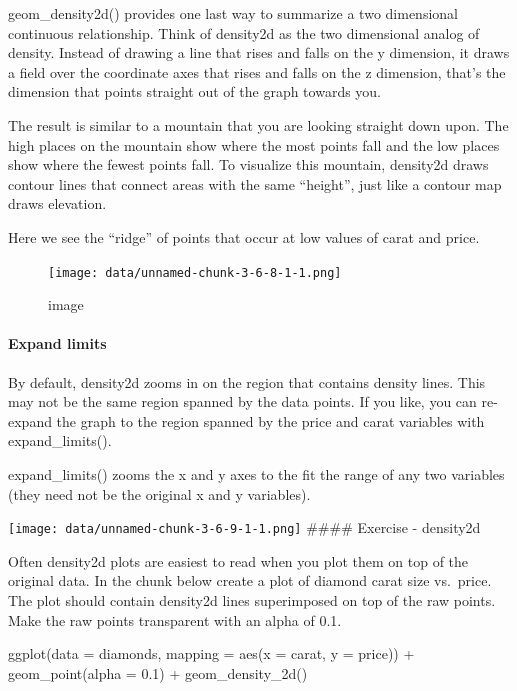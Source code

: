 \documentclass[
]{article}
\newenvironment{Shaded}{\begin{snugshade}}{\end{snugshade}}
\newcommand{\AttributeTok}[1]{\textcolor[rgb]{0.77,0.63,0.00}{#1}}
\newcommand{\FloatTok}[1]{\textcolor[rgb]{0.00,0.00,0.81}{#1}}
\newcommand{\FunctionTok}[1]{\textcolor[rgb]{0.00,0.00,0.00}{#1}}
\newcommand{\NormalTok}[1]{#1}
\newcommand{\SpecialCharTok}[1]{\textcolor[rgb]{0.00,0.00,0.00}{#1}}
\begin{document}
geom\_density2d() provides one last way to summarize a two dimensional
continuous relationship. Think of density2d as the two dimensional
analog of density. Instead of drawing a line that rises and falls on the
y dimension, it draws a field over the coordinate axes that rises and
falls on the z dimension, that's the dimension that points straight out
of the graph towards you.

The result is similar to a mountain that you are looking straight down
upon. The high places on the mountain show where the most points fall
and the low places show where the fewest points fall. To visualize this
mountain, density2d draws contour lines that connect areas with the same
``height'', just like a contour map draws elevation.

Here we see the ``ridge'' of points that occur at low values of carat
and price.

\begin{figure}
\centering
\texttt{[image: data/unnamed-chunk-3-6-8-1-1.png]}
\caption{image}
\end{figure}

\hypertarget{expand-limits}{%
\paragraph{Expand limits}\label{expand-limits}}

By default, density2d zooms in on the region that contains density
lines. This may not be the same region spanned by the data points. If
you like, you can re-expand the graph to the region spanned by the price
and carat variables with expand\_limits().

expand\_limits() zooms the x and y axes to the fit the range of any two
variables (they need not be the original x and y variables).

\texttt{[image: data/unnamed-chunk-3-6-9-1-1.png]} \#\#\#\# Exercise -
density2d

Often density2d plots are easiest to read when you plot them on top of
the original data. In the chunk below create a plot of diamond carat
size vs.~price. The plot should contain density2d lines superimposed on
top of the raw points. Make the raw points transparent with an alpha of
0.1.

\begin{Shaded}
\begin{Highlighting}[]
\FunctionTok{ggplot}\NormalTok{(}\AttributeTok{data =}\NormalTok{ diamonds, }\AttributeTok{mapping =} \FunctionTok{aes}\NormalTok{(}\AttributeTok{x =}\NormalTok{ carat, }\AttributeTok{y =}\NormalTok{ price)) }\SpecialCharTok{+}
  \FunctionTok{geom\_point}\NormalTok{(}\AttributeTok{alpha =} \FloatTok{0.1}\NormalTok{) }\SpecialCharTok{+} 
  \FunctionTok{geom\_density\_2d}\NormalTok{()}
\end{Highlighting}
\end{Shaded}
\end{document}

